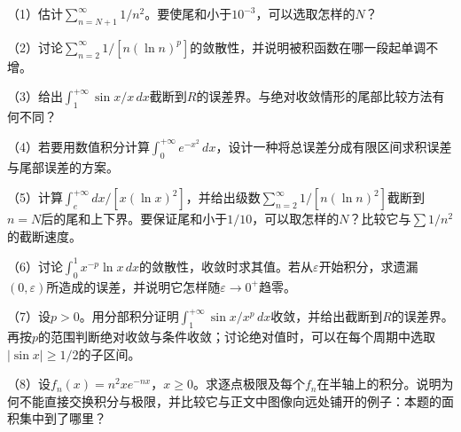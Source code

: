 \begin{exercise}
\mbox{}\par\nobreak

（1）估计\(\sum_{n=N+1}^{\infty}1/n^2\)。要使尾和小于\(10^{-3}\)，可以选取怎样的\(N\)？

（2）讨论\(\sum_{n=2}^{\infty}1/[n(\ln n)^p]\)的敛散性，并说明被积函数在哪一段起单调不增。

（3）给出\(\int_1^{+\infty}\sin x/x\,dx\)截断到\(R\)的误差界。与绝对收敛情形的尾部比较方法有何不同？

（4）若要用数值积分计算\(\int_0^{+\infty}e^{-x^2}\,dx\)，设计一种将总误差分成有限区间求积误差与尾部误差的方案。

（5）计算\(\int_e^{+\infty}dx/[x(\ln x)^2]\)，并给出级数\(\sum_{n=2}^{\infty}1/[n(\ln n)^2]\)截断到\(n=N\)后的尾和上下界。要保证尾和小于\(1/10\)，可以取怎样的\(N\)？比较它与\(\sum1/n^2\)的截断速度。

（6）讨论\(\int_0^1x^{-p}\ln x\,dx\)的敛散性，收敛时求其值。若从\(\varepsilon\)开始积分，求遗漏\((0,\varepsilon)\)所造成的误差，并说明它怎样随\(\varepsilon\to0^+\)趋零。

（7）设\(p>0\)。用分部积分证明\(\int_1^{+\infty}\sin x/x^p\,dx\)收敛，并给出截断到\(R\)的误差界。再按\(p\)的范围判断绝对收敛与条件收敛；讨论绝对值时，可以在每个周期中选取\(|\sin x|\ge1/2\)的子区间。

（8）设\(f_n(x)=n^2xe^{-nx}\)，\(x\ge0\)。求逐点极限及每个\(f_n\)在半轴上的积分。说明为何不能直接交换积分与极限，并比较它与正文中图像向远处铺开的例子：本题的面积集中到了哪里？
\end{exercise}
